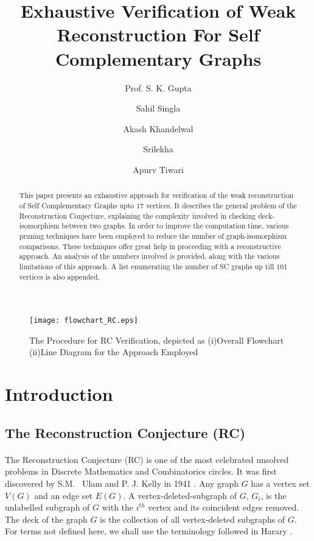 \documentclass[12pt,conference]{IEEEtran}
\begin{document}
\title{Exhaustive Verification of Weak Reconstruction For Self Complementary Graphs }
\author{{ Prof. S. K. Gupta} \and { Sahil Singla} \and { Akash Khandelwal}\and { Srilekha} \and { Apurv Tiwari }}
\author{   }

\maketitle

\begin{abstract}
This paper presents an exhaustive approach for verification of the weak reconstruction of Self Complementary Graphs upto $17$ vertices. It describes the general problem of the Reconstruction Conjecture, explaining the complexity involved in checking deck-isomorphism between two graphs. In order to improve the computation time, various pruning  techniques have been employed to reduce the number of graph-isomorphism comparisons. These techniques offer great help in proceeding with a reconstructive approach. An analysis of the numbers involved is provided, along with the various limitations of this approach. A list enumerating the number of SC graphs up till $101$ vertices is also appended.  
\end{abstract}


\begin{figure*}
	  \centering 
           \texttt{[image: flowchart\_RC.eps]}
	   \caption{The Procedure for RC Verification, depicted as (i)Overall Flowchart (ii)Line Diagram for the Approach Employed}
	   \label{flowchart}
  \end{figure*} 


\section{Introduction}
\subsection{ The Reconstruction Conjecture (RC)}
\paragraph*{} The Reconstruction Conjecture (RC) is one of the most celebrated unsolved problems in Discrete Mathematics and Combinatorics circles. It was first discovered by S.M.  Ulam and P. J. Kelly in 1941 \cite{b3} . Any graph $G$ has a vertex set $V(G)$ and an edge set $E(G)$. A vertex-deleted-subgraph of $G$, $G_i$, is the unlabelled subgraph of $G$ with the $i^{th}$ vertex and its coincident edges removed. The deck of the graph $G$ is the collection of all vertex-deleted subgraphs of $G$. For terms not defined here, we shall use the terminology followed in Harary \cite{h1}. 
\end{document}
